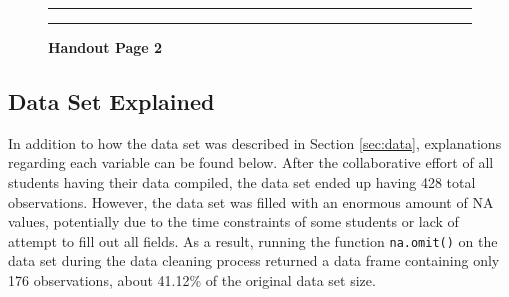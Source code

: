 \documentclass[]{article}
\begin{document}
\begin{figure}[!ht]
    \hrule
    \caption{ \textbf{Handout Page 2} }
    \begin{center}
    \end{center}
    \label{fig:handout-2}
    \hrule
\end{figure}

\newpage

\subsection{Data Set Explained}
\label{sec:appendix-dataset-ex}

In addition to how the data set was described in Section \ref{sec:data},
explanations regarding each variable can be found below. After the
collaborative effort of all students having their data compiled, the
data set ended up having 428 total observations. However, the data set
was filled with an enormous amount of NA values, potentially due to the
time constraints of some students or lack of attempt to fill out all
fields. As a result, running the function \texttt{na.omit()} on the data
set during the data cleaning process returned a data frame containing
only 176 observations, about 41.12\% of the original data set size.
\end{document}
